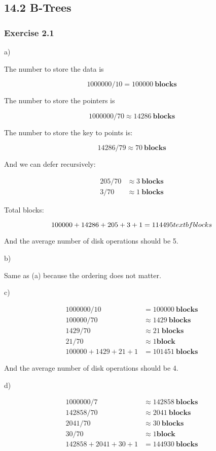 \documentclass[../../main.tex]{subfiles}
\begin{document}
\subsection{14.2 B-Trees}

\subsubsection*{Exercise 2.1}

a)

The number to store the data is

$$
1000000 / 10 = 100000 \ \textbf{blocks}
$$

The number to store the pointers is

$$
1000000 / 70 \approx 14286 \ \textbf{blocks}
$$

The number to store the key to points is:

$$
14286 / 79 \approx 70 \ \textbf{blocks}
$$

And we can defer recursively:

\begin{align*}
205 / 70 &\approx 3 \ \textbf{blocks} \\
3 / 70 &\approx 1 \ \textbf{blocks}
\end{align*}

Total blocks:

$$
100000 + 14286 + 205 + 3 + 1 = 114495 \\ textbf{blocks}
$$

And the average number of disk operations should be 5.

b)

Same as (a) because the ordering does not matter.

c)

\begin{align*}
  1000000/ 10 &= 100000 \ \textbf{blocks} \\
  100000 / 70 &\approx 1429 \ \textbf{blocks} \\
  1429 / 70 &\approx 21 \ \textbf{blocks} \\
  21 / 70 &\approx 1 \textbf{block} \\
  100000 + 1429 + 21 + 1 &= 101451 \ \textbf{blocks}
\end{align*}

And the average number of disk operations should be 4.

d)

\begin{align*}
  1000000/ 7 &\approx 142858 \ \textbf{blocks} \\
  142858 / 70 &\approx 2041 \ \textbf{blocks} \\
  2041 / 70 &\approx 30 \ \textbf{blocks} \\
  30 / 70 &\approx 1 \textbf{block} \\
  142858 + 2041 + 30 + 1 &= 144930 \ \textbf{blocks}
\end{align*}
\end{document}
